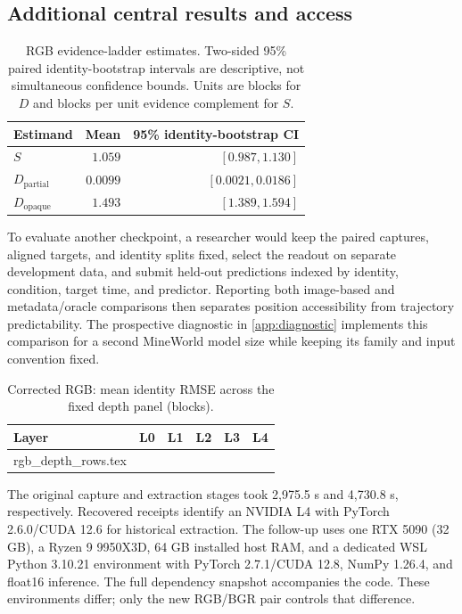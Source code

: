 \documentclass{article}
\makeatletter
\let\tablerows\@@input
\makeatother
\begin{document}
\subsection{Additional central results and access}
\begin{table}[!htbp]
  \caption{RGB evidence-ladder estimates. Two-sided 95\% paired identity-bootstrap intervals are descriptive, not simultaneous confidence bounds. Units are blocks for $D$ and blocks per unit evidence complement for $S$.}
  \label{tab:exp3-primary}
  \centering
  \small
  \setlength{\tabcolsep}{3.5pt}
  \begin{tabular}{@{}lrr@{}}
    \toprule
    Estimand & Mean & 95\% identity-bootstrap CI \\
    \midrule
    $S$ & $1.059$ & $[0.987,1.130]$ \\
    $D_{\mathrm{partial}}$ & $0.0099$ & $[0.0021,0.0186]$ \\
    $D_{\mathrm{opaque}}$ & $1.493$ & $[1.389,1.594]$ \\
    \bottomrule
  \end{tabular}
\end{table}

To evaluate another checkpoint, a researcher would keep the paired captures, aligned targets, and identity splits fixed, select the readout on separate development data, and submit held-out predictions indexed by identity, condition, target time, and predictor. Reporting both image-based and metadata/oracle comparisons then separates position accessibility from trajectory predictability. The prospective diagnostic in \autoref{app:diagnostic} implements this comparison for a second MineWorld model size while keeping its family and input convention fixed.

\begin{table}[!htbp]
  \caption{Corrected RGB: mean identity RMSE across the fixed depth panel (blocks).}
  \label{tab:exp3-depth}
  \centering
  \small
  \begin{tabular}{@{}lrrrrr@{}}
    \toprule
    Layer & L0 & L1 & L2 & L3 & L4 \\
    \midrule
    \tablerows rgb_depth_rows.tex
    \bottomrule
  \end{tabular}
\end{table}
The original capture and extraction stages took 2,975.5 s and 4,730.8 s, respectively. Recovered receipts identify an NVIDIA L4 with PyTorch 2.6.0/CUDA 12.6 for historical extraction. The follow-up uses one RTX 5090 (32 GB), a Ryzen 9 9950X3D, 64 GB installed host RAM, and a dedicated WSL Python 3.10.21 environment with PyTorch 2.7.1/CUDA 12.8, NumPy 1.26.4, and float16 inference. The full dependency snapshot accompanies the code. These environments differ; only the new RGB/BGR pair controls that difference.
\end{document}
